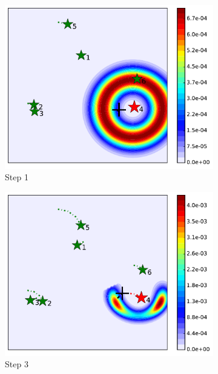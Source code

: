 \documentclass[journal]{IEEEtranTIE}
\theoremstyle{remark}
\begin{document}
	\begin{figure}%
		\centering
		\begin{subfigure}[b]{0.21\textwidth}
			\includegraphics[width=\textwidth]{hetero_mov_sen_mov_tar_rbt4_step1_16-TIE-3798}
			\caption{Step 1}\label{fig:htr_mov_sen_mov_tar_sing1}
		\end{subfigure}
		\begin{subfigure}[b]{0.21\textwidth}
			\includegraphics[width=\textwidth]{hetero_mov_sen_mov_tar_rbt4_step3_16-TIE-3798}
			\caption{Step 3}\label{fig:htr_mov_sen_mov_tar_sing2}
		\end{subfigure}
		\begin{subfigure}[b]{0.21\textwidth}

\end{subfigure}
\end{figure}
\end{document}
